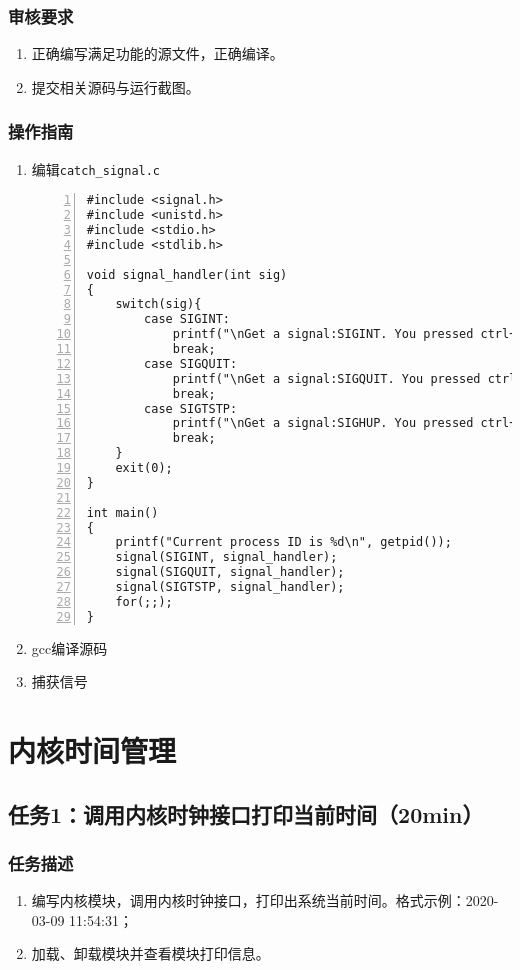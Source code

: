 \documentclass{article}
\begin{document}
\subsubsection{审核要求}
\begin{enumerate}
	\item 正确编写满足功能的源文件，正确编译。
	\item 提交相关源码与运行截图。
\end{enumerate}

\subsubsection{操作指南}
\newpage
\begin{enumerate}
	\item 编辑\verb|catch_signal.c|
	      \begin{lstlisting}[numbers=left]
#include <signal.h>
#include <unistd.h>
#include <stdio.h>
#include <stdlib.h>

void signal_handler(int sig)
{
	switch(sig){
		case SIGINT:
			printf("\nGet a signal:SIGINT. You pressed ctrl+c.\n");
			break;
		case SIGQUIT:
			printf("\nGet a signal:SIGQUIT. You pressed ctrl+\\.\n");
			break;
		case SIGTSTP:
			printf("\nGet a signal:SIGHUP. You pressed ctrl+z.\n");
			break;
	}
	exit(0);
}

int main()
{
	printf("Current process ID is %d\n", getpid());
	signal(SIGINT, signal_handler);
	signal(SIGQUIT, signal_handler);
	signal(SIGTSTP, signal_handler);
	for(;;);
}

\end{lstlisting}
	\item gcc编译源码
	\item 捕获信号
\end{enumerate}

\newpage


\section{内核时间管理}
\subsection{任务1：调用内核时钟接口打印当前时间（20min）}

\subsubsection{任务描述}
\begin{enumerate}
	\item 编写内核模块，调用内核时钟接口，打印出系统当前时间。格式示例：2020-03-09 11:54:31；
	\item 加载、卸载模块并查看模块打印信息。
\end{enumerate}
\end{document}
